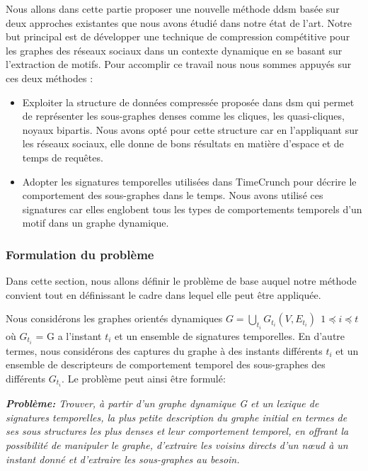Nous allons dans cette partie proposer une nouvelle méthode \gls{ddsm} basée sur deux approches existantes que nous avons étudié dans notre état de l'art. Notre but principal est de développer une technique de compression compétitive pour les graphes des réseaux sociaux dans un contexte dynamique en se basant sur l'extraction de motifs. Pour accomplir ce travail nous nous sommes appuyés sur ces deux méthodes :
\begin{itemize}
\item Exploiter la structure de données compressée proposée dans \gls{dsm} \citep{hernandez2014compressed} qui permet de représenter les sous-graphes denses comme les cliques, les quasi-cliques, noyaux bipartis. Nous avons opté pour cette structure car en l'appliquant sur les réseaux sociaux, elle donne de bons résultats en matière d'espace et de temps de requêtes.  
\item Adopter les signatures temporelles utilisées dans TimeCrunch \citep{shah2015timecrunch} pour décrire le comportement des sous-graphes dans le temps. Nous avons utilisé ces signatures car elles englobent tous les types de comportements temporels d'un motif dans un graphe dynamique.
\end{itemize}	
		
		\subsubsection{Formulation du problème}
		Dans cette section, nous allons définir le problème de base auquel notre méthode convient tout en définissant le cadre dans lequel elle peut être appliquée. 
		
		Nous considérons les graphes orientés dynamiques $\displaystyle{G=\bigcup_{t_{i}}G_{t_{i}}(V,E_{t_{i}})}\ \ 1 \preceq i \preceq t$ où $G_{t_{i}}$ = G a l'instant $t_{i}$ et un ensemble de signatures temporelles. En d'autre termes, nous considérons des captures du graphe à des instants différents $t_{i}$ et un ensemble de descripteurs de comportement temporel des sous-graphes des différents $G_{t_{i}}$. Le problème peut ainsi être formulé:
		
			\textit{\textbf{Problème:}
		Trouver, à partir d'un graphe dynamique G et un lexique de signatures temporelles, la plus petite description du graphe initial en termes de ses sous structures les plus denses et leur comportement temporel, en offrant la possibilité de manipuler le graphe, d'extraire les voisins directs d'un nœud à un instant donné et d'extraire les sous-graphes au besoin. }

